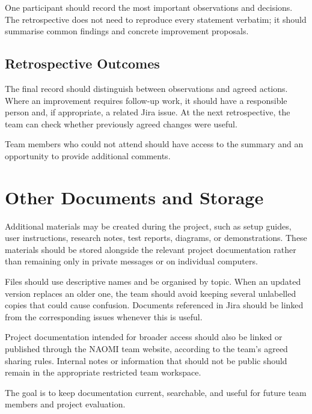 \documentclass[12pt,a4paper]{article}
\begin{document}
One participant should record the most important observations and decisions.
The retrospective does not need to reproduce every statement verbatim;
it should summarise common findings and concrete improvement proposals.

\subsection{Retrospective Outcomes}

The final record should distinguish between observations and agreed actions.
Where an improvement requires follow-up work, it should have a responsible
person and, if appropriate, a related Jira issue. At the next retrospective,
the team can check whether previously agreed changes were useful.

Team members who could not attend should have access to the summary and an
opportunity to provide additional comments.


\section{Other Documents and Storage}

Additional materials may be created during the project, such as setup guides,
user instructions, research notes, test reports, diagrams, or demonstrations.
These materials should be stored alongside the relevant project documentation
rather than remaining only in private messages or on individual computers.

Files should use descriptive names and be organised by topic. When an updated
version replaces an older one, the team should avoid keeping several
unlabelled copies that could cause confusion. Documents referenced in Jira
should be linked from the corresponding issues whenever this is useful.

Project documentation intended for broader access should also be linked or
published through the NAOMI team website, according to the team's agreed
sharing rules. Internal notes or information that should not be public should
remain in the appropriate restricted team workspace.

The goal is to keep documentation current, searchable, and useful for future
team members and project evaluation.
\end{document}
